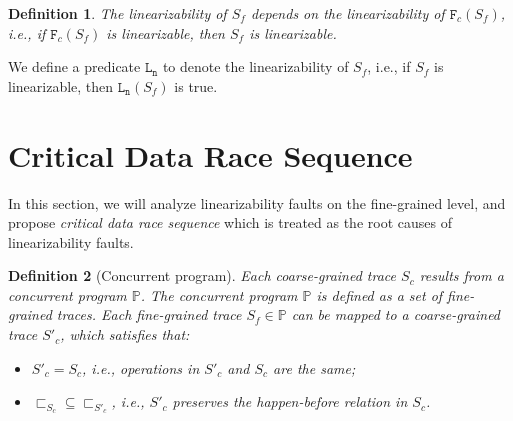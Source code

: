 \documentclass[runningheads]{llncs}
\newcommand{\p}{\mathbb{P} }
\newcommand{\ft}{S_f}
\newcommand{\ct}{S_c}
\newtheorem{myDef}{Definition}
\begin{document}
\begin{myDef}
The linearizability of $S_f$ depends on the linearizability of $\mathtt{F}_c(S_f)$, i.e., if $\mathtt{F}_c(S_f)$ is linearizable, then $S_f$ is linearizable. \end{myDef}

We define a predicate $\mathtt{L_n}$ to denote the linearizability of $S_f$, i.e., if $S_f$ is linearizable, then $\mathtt{L_n}(S_f)$ is true.


\section{Critical Data Race Sequence}\label{sec:criticaldataraces}



In this section, we will analyze linearizability faults on the fine-grained level, and propose \textit{critical data race sequence} which is treated as the root causes of linearizability faults.



\begin{myDef}[Concurrent program]\label{def:concurrentprogram}
Each coarse-grained trace $\ct$ results from a \textit{concurrent program} $\mathbb{P}$.
The concurrent program $\p$ 
 is defined as a set of fine-grained traces.
Each fine-grained trace $\ft \in \p$ can be mapped to a coarse-grained trace $S'_c$, which satisfies that: 
\begin{itemize}
  \item $S'_c = S_c$, i.e., operations in $S'_c$ and $S_c$ are the same;
  \item $\sqsubset_{S_c}\subseteq \sqsubset_{S'_c}$, i.e., $S'_c$ preserves the \textit{happen-before} relation in $S_c$.
\end{itemize}
\end{myDef}
\end{document}
